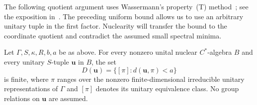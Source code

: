 The following quotient argument uses Wassermann's property~(T)
method~\cite{Wassermann1991}; see the exposition
in~\cite[Section~2.1]{ManuilovThomsen2007}. The preceding uniform bound
allows us to use an arbitrary unitary tuple in the first factor.
Nuclearity will transfer the bound to the coordinate quotient and
contradict the assumed small spectral minima.

\begin{lemma}\label{lem:nuclear-finiteness}
Let $\Gamma,S,\kappa,R,b,a$ be as above. For every nonzero unital
nuclear $C^*$-algebra $B$ and every unitary $S$-tuple $\mathbf u$ in $B$,
the set
\[
 D(\mathbf u)=\{[\pi]:d(\mathbf u,\pi)<a\}
\]
is finite, where $\pi$ ranges over the nonzero finite-dimensional
irreducible unitary representations of $\Gamma$ and $[\pi]$ denotes its
unitary equivalence class. No group relations on $\mathbf u$ are assumed.
\end{lemma}

